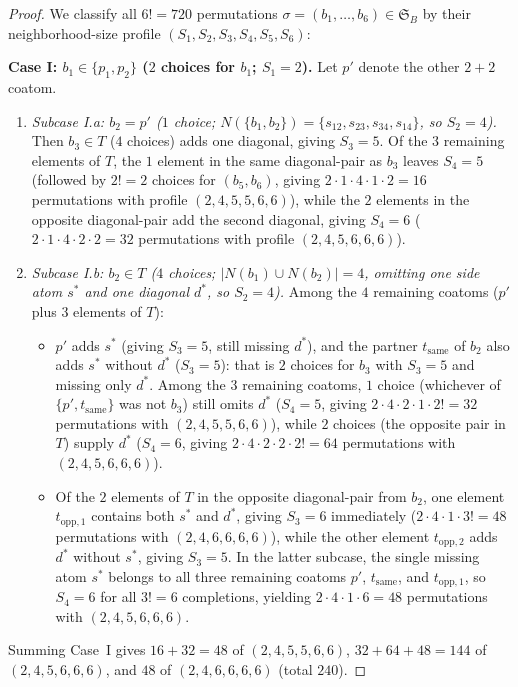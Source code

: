 \documentclass[11pt]{article}
\theoremstyle{definition}
\newcommand{\Sym}{\mathfrak{S}}
\begin{document}
\begin{proof}
We classify all $6! = 720$ permutations $\sigma = (b_1, \dots, b_6) \in \Sym_B$ by
their neighborhood-size profile $(S_1, S_2, S_3, S_4, S_5, S_6)$:

\medskip
\noindent\textbf{Case I: $b_1 \in \{p_1, p_2\}$ ($2$ choices for $b_1$; $S_1 = 2$).}
Let $p'$ denote the other $2+2$ coatom.
\begin{enumerate}
  \item \emph{Subcase I.a: $b_2 = p'$ ($1$ choice; $N(\{b_1,b_2\}) = \{s_{12},s_{23},
  s_{34},s_{14}\}$, so $S_2 = 4$).}
  Then $b_3 \in T$ ($4$ choices) adds one diagonal, giving $S_3 = 5$. Of the $3$ remaining
  elements of $T$, the $1$ element in the same diagonal-pair as $b_3$ leaves $S_4 = 5$
  (followed by $2! = 2$ choices for $(b_5, b_6)$, giving $2 \cdot 1 \cdot 4 \cdot 1 \cdot
  2 = 16$ permutations with profile $(2,4,5,5,6,6)$), while the $2$ elements in the
  opposite diagonal-pair add the second diagonal, giving $S_4 = 6$ ($2 \cdot 1 \cdot 4
  \cdot 2 \cdot 2 = 32$ permutations with profile $(2,4,5,6,6,6)$).

  \item \emph{Subcase I.b: $b_2 \in T$ ($4$ choices; $|N(b_1) \cup N(b_2)| = 4$, omitting
  one side atom $s^*$ and one diagonal $d^*$, so $S_2 = 4$).}
  Among the $4$ remaining coatoms ($p'$ plus $3$ elements of $T$):
  \begin{itemize}
    \item $p'$ adds $s^*$ (giving $S_3 = 5$, still missing $d^*$), and the partner
    $t_{\mathrm{same}}$ of $b_2$ also adds $s^*$ without $d^*$ ($S_3 = 5$): that is $2$
    choices for $b_3$ with $S_3 = 5$ and missing only $d^*$. Among the $3$ remaining
    coatoms, $1$ choice (whichever of $\{p', t_{\mathrm{same}}\}$ was not $b_3$) still
    omits $d^*$ ($S_4 = 5$, giving $2 \cdot 4 \cdot 2 \cdot 1 \cdot 2! = 32$ permutations
    with $(2,4,5,5,6,6)$), while $2$ choices (the opposite pair in $T$) supply $d^*$
    ($S_4 = 6$, giving $2 \cdot 4 \cdot 2 \cdot 2 \cdot 2! = 64$ permutations with
    $(2,4,5,6,6,6)$).
    \item Of the $2$ elements of $T$ in the opposite diagonal-pair from $b_2$, one element
    $t_{\mathrm{opp},1}$ contains both $s^*$ and $d^*$, giving $S_3 = 6$ immediately
    ($2 \cdot 4 \cdot 1 \cdot 3! = 48$ permutations with $(2,4,6,6,6,6)$), while the other
    element $t_{\mathrm{opp},2}$ adds $d^*$ without $s^*$, giving $S_3 = 5$. In the latter
    subcase, the single missing atom $s^*$ belongs to all three remaining coatoms
    $p'$, $t_{\mathrm{same}}$, and $t_{\mathrm{opp},1}$, so $S_4 = 6$ for all $3! = 6$
    completions, yielding $2 \cdot 4 \cdot 1 \cdot 6 = 48$ permutations with
    $(2,4,5,6,6,6)$.
  \end{itemize}
\end{enumerate}
Summing Case~I gives $16 + 32 = 48$ of $(2,4,5,5,6,6)$, $32 + 64 + 48 = 144$ of
$(2,4,5,6,6,6)$, and $48$ of $(2,4,6,6,6,6)$ (total $240$).


\end{proof}
\end{document}
